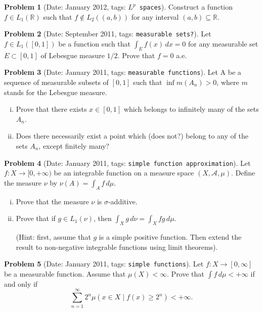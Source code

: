 \documentclass[11pt, notitlepage]{article}
\theoremstyle{definition}
\theoremstyle{definition}
\theoremstyle{definition}
\newtheorem{probstate}{Problem}
\theoremstyle{remark}
\newenvironment{problem}[2]{
    \begin{probstate}[Date: #1, tags: \texttt{#2}]
}
{
  \end{probstate}
}
\newcommand{\R}{\mathbb{R}}
\begin{document}
\begin{problem}{January 2012}{$L^p$ spaces}
  Construct a function $f \in L_1(\R)$ such that $f \notin L_2((a,b))$ for any interval $(a,b) \subseteq \R$.
\end{problem}

\begin{problem}{September 2011}{measurable sets?}
  Let $f \in L_1([0,1])$ be a function such that $\int_E f (x) \, dx=0$ for any measurable set $E \subset [0,1]$ of Lebesgue measure $1/2$.
  Prove that $f=0$ a.e.
\end{problem}

\begin{problem}{January 2011}{measurable functions}
  \item Let A be a sequence of measurable subsets of $[0,1]$ such that $\inf m(A_n)>0$, where $m$ stands for the Lebesgue measure.
   \begin{enumerate}[(i)]
    \item Prove that there exists $x \in [0,1]$ which belongs to infinitely many of the sets $A_n$.
    \item Does there necessarily exist a point which {\color{red} (does not?)} belong to any of the sets $A_n$, except finitely many?
   \end{enumerate}
\end{problem}

\begin{problem}{January 2011}{simple function approximation}
  Let $f:X \to [0, +\infty)$ be an integrable function on
    a measure space $(X, \mathcal{A},\mu)$.
    Define the measure $\nu$ by $\nu(A)=\int_A f \, d \mu$.
    \begin{enumerate}[(i)]
        \item Prove that the measure $\nu$ is $\sigma$-additive.

        \item Prove that if
        $g \in L_1(\nu)$, then
        $\int_X g \, d \nu =\int_X fg \, d \mu$.

        (Hint: first, assume that $g$ is a simple positive
        function. Then extend the result to non-negative
        integrable functions using limit theorems).
    \end{enumerate}
\end{problem}

\begin{problem}{January 2011}{simple functions}
  Let $f:X \to [0, \infty]$ be a measurable
 function. Assume that $\mu (X) < \infty$.
 Prove that $\int f \, d \mu< +\infty$ if and only if
 \[
 \sum_{n=1}^{\infty} 2^n \mu (x \in X \mid f(x) \ge 2^n) < +\infty.
 \]
\end{problem}
\end{document}
